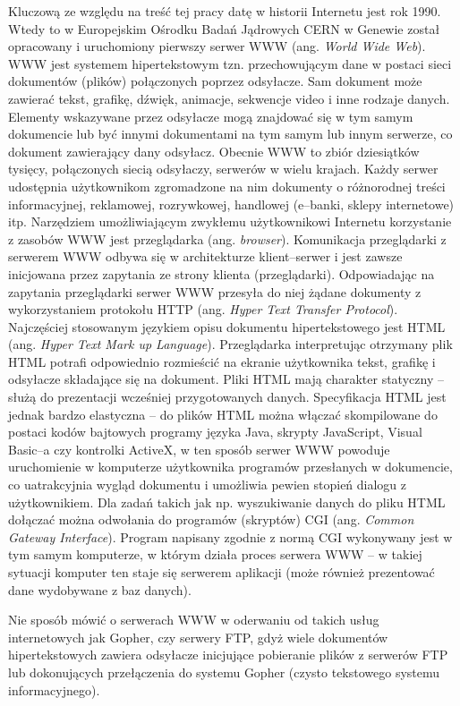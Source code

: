 Kluczową ze względu na treść tej pracy datę w historii Internetu jest rok 1990. Wtedy to w Europejskim Ośrodku 
Badań Jądrowych CERN w Genewie został opracowany i uruchomiony pierwszy serwer WWW (ang. \emph{World Wide Web}). WWW 
jest systemem hipertekstowym tzn. przechowującym dane w postaci sieci dokumentów (plików) połączonych poprzez 
odsyłacze. Sam dokument może zawierać tekst, grafikę, dźwięk, animacje,  sekwencje video i inne rodzaje danych.  
Elementy wskazywane przez odsyłacze mogą znajdować się w tym samym dokumencie lub być innymi dokumentami na tym 
samym lub innym serwerze, co dokument zawierający dany odsyłacz. Obecnie WWW to zbiór dziesiątków tysięcy, 
połączonych siecią odsyłaczy, serwerów w wielu krajach. Każdy serwer udostępnia użytkownikom zgromadzone na nim 
dokumenty o różnorodnej treści informacyjnej, reklamowej, rozrywkowej, handlowej (e--banki, sklepy internetowe) itp.
Narzędziem umożliwiającym zwykłemu użytkownikowi Internetu korzystanie z zasobów WWW jest przeglądarka
(ang. \emph{browser}). Komunikacja przeglądarki z serwerem WWW odbywa się w architekturze klient--serwer i jest 
zawsze inicjowana przez zapytania ze strony klienta (przeglądarki). Odpowiadając na zapytania przeglądarki serwer
WWW przesyła do niej żądane dokumenty z wykorzystaniem protokołu HTTP (ang. 
\emph{Hyper Text Transfer Protocol}). Najczęściej stosowanym językiem opisu dokumentu hipertekstowego jest HTML 
(ang. \emph{Hyper Text Mark up Language}). Przeglądarka interpretując otrzymany plik HTML potrafi odpowiednio rozmieścić 
na ekranie użytkownika tekst, grafikę i odsyłacze składające się na dokument. Pliki HTML mają  charakter 
statyczny -- służą do prezentacji wcześniej przygotowanych danych. Specyfikacja HTML jest jednak bardzo 
elastyczna -- do plików HTML można włączać skompilowane do postaci kodów bajtowych programy języka Java, 
skrypty JavaScript, Visual Basic--a czy kontrolki ActiveX, w ten sposób serwer WWW powoduje uruchomienie w 
komputerze użytkownika  programów przesłanych w dokumencie, co uatrakcyjnia wygląd dokumentu i umożliwia pewien 
stopień dialogu z użytkownikiem. Dla zadań takich jak np. wyszukiwanie danych do pliku HTML dołączać można 
odwołania do programów (skryptów) CGI (ang. \emph{Common Gateway Interface}). Program napisany zgodnie z normą CGI 
wykonywany jest w tym samym komputerze, w którym działa proces serwera WWW -- w takiej sytuacji komputer ten 
staje się serwerem aplikacji (może również prezentować dane wydobywane z baz danych).

Nie sposób mówić o serwerach WWW w oderwaniu od takich usług internetowych jak 
Gopher, czy serwery FTP, gdyż wiele dokumentów hipertekstowych zawiera odsyłacze inicjujące pobieranie plików z 
serwerów FTP lub dokonujących przełączenia do systemu Gopher (czysto tekstowego systemu informacyjnego).

